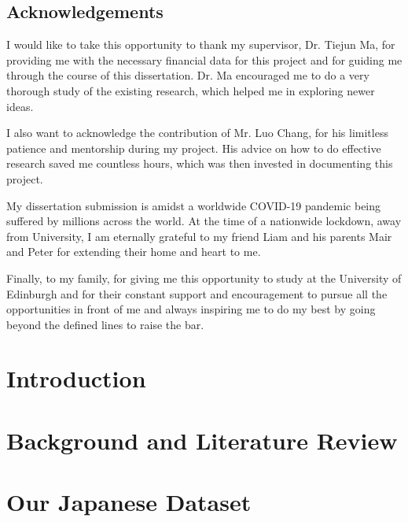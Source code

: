 \documentclass[bsc,frontabs,twoside,singlespacing,parskip,deptreport]{infthesis}     %
\begin{document}
\maketitle

\section*{Acknowledgements}
I would like to take this opportunity to thank my supervisor, Dr. Tiejun Ma, for providing me with the necessary financial data for this project and for guiding me through the course of this dissertation. Dr. Ma encouraged me to do a very thorough study of the existing research, which helped me in exploring newer ideas. 

I also want to acknowledge the contribution of Mr. Luo Chang, for his limitless patience and mentorship during my project. His advice on how to do effective research saved me countless hours, which was then invested in documenting this project.

My dissertation submission is amidst a worldwide COVID-19 pandemic being suffered by millions across the world. At the time of a nationwide lockdown, away from University, I am eternally grateful to my friend Liam and his parents Mair and Peter for extending their home and heart to me.

Finally, to my family, for giving me this opportunity to study at the University of Edinburgh and for their constant support and encouragement to pursue all the opportunities in front of me and always inspiring me to do my best by going beyond the defined lines to raise the bar.

\tableofcontents



\chapter{Introduction}



\chapter{Background and Literature Review}


\chapter{Our Japanese Dataset}

\end{document}
